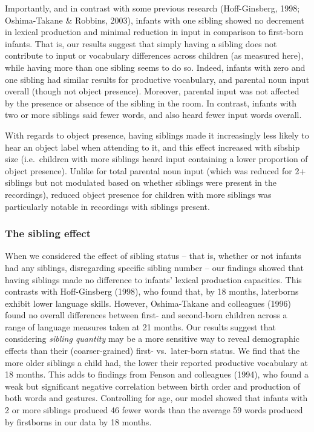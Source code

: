 \documentclass[
  man,floatsintext]{apa6}
\begin{document}
Importantly, and in contrast with some previous research (Hoff-Ginsberg, 1998; Oshima-Takane \& Robbins, 2003), infants with one sibling showed no decrement in lexical production and minimal reduction in input in comparison to first-born infants. That is, our results suggest that simply having a sibling does not contribute to input or vocabulary differences across children (as measured here), while having more than one sibling seems to do so. Indeed, infants with zero and one sibling had similar results for productive vocabulary, and parental noun input overall (though not object presence). Moreover, parental input was not affected by the presence or absence of the sibling in the room. In contrast, infants with two or more siblings said fewer words, and also heard fewer input words overall.

With regards to object presence, having siblings made it increasingly less likely to hear an object label when attending to it, and this effect increased with sibship size (i.e.~children with more siblings heard input containing a lower proportion of object presence). Unlike for total parental noun input (which was reduced for 2+ siblings but not modulated based on whether siblings were present in the recordings), reduced object presence for children with more siblings was particularly notable in recordings with siblings present.

\hypertarget{the-sibling-effect}{%
\subsubsection{The sibling effect}\label{the-sibling-effect}}

When we considered the effect of sibling status -- that is, whether or not infants had any siblings, disregarding specific sibling number -- our findings showed that having siblings made no difference to infants' lexical production capacities. This contrasts with Hoff-Ginsberg (1998), who found that, by 18 months, laterborns exhibit lower language skills. However, Oshima-Takane and colleagues (1996) found no overall differences between first- and second-born children across a range of language measures taken at 21 months. Our results suggest that considering \emph{sibling quantity} may be a more sensitive way to reveal demographic effects than their (coarser-grained) first- vs.~later-born status. We find that the more older siblings a child had, the lower their reported productive vocabulary at 18 months. This adds to findings from Fenson and colleagues (1994), who found a weak but significant negative correlation between birth order and production of both words and gestures. Controlling for age, our model showed that infants with 2 or more siblings produced 46 fewer words than the average 59 words produced by firstborns in our data by 18 months.
\end{document}
